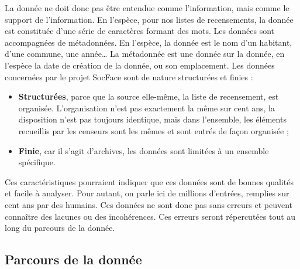 La donnée ne doit donc pas être entendue comme l’information, mais comme le support de l’information. En l’espèce, pour nos listes de recensements, la donnée est constituée d’une série de caractères formant des mots. Les données sont accompagnées de métadonnées. En l’espèce, la donnée est le nom d’un habitant, d’une commune, une année… La métadonnée est une donnée sur la donnée, en l’espèce la date de création de la donnée, ou son emplacement. 
Les données concernées par le projet SocFace sont de nature structurées et finies : 
\begin{itemize}
    \item \textbf{Structurées}, parce que la source elle-même, la liste de recensement, est organisée. L’organisation n’est pas exactement la même sur cent ans, la disposition n’est pas toujours identique, mais dans l’ensemble, les éléments recueillis par les censeurs sont les mêmes et sont entrés de façon organisée ; 
    \item \textbf{Finie}, car il s’agit d’archives, les données sont limitées à un ensemble spécifique. 
\end{itemize}
Ces caractéristiques pourraient indiquer que ces données sont de bonnes qualités et facile à analyser. Pour autant, on parle ici de millions d’entrées, remplies sur cent ans par des humains. Ces données ne sont donc pas sans erreurs et peuvent connaître des lacunes ou des incohérences. Ces erreurs seront répercutées tout au long du parcours de la donnée.
        
        \subsection{Parcours de la donnée}

